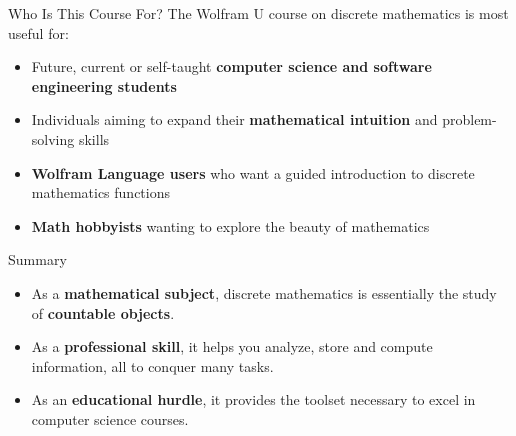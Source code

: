 \documentclass[aspectratio=169,11pt]{beamer}
\newcommand{\hly}[1]{\colorbox{hlYellow}{#1}}
\begin{document}
\begin{frame}{Who Is This Course For?}
  The Wolfram U course on discrete mathematics is most useful for:

  \bigskip
  \begin{itemize}
    \setlength\itemsep{0.5em}
    \item Future, current or self-taught
          \textbf{computer science and software engineering students}
    \item Individuals aiming to expand their
          \textbf{mathematical intuition} and problem-solving skills
    \item \textbf{Wolfram Language users} who want a guided
          introduction to discrete mathematics functions
    \item \textbf{Math hobbyists} wanting to explore the
          beauty of mathematics
  \end{itemize}
\end{frame}

\begin{frame}{Summary}
  \begin{itemize}
    \setlength\itemsep{0.8em}
    \item As a \textbf{mathematical subject}, discrete mathematics
          is essentially the study of \textbf{countable objects}.

    \item As a \textbf{professional skill}, it helps you analyze,
          store and compute information, all to conquer many tasks.

    \item As an \textbf{educational hurdle}, it provides the
          toolset necessary to
          \hly{excel in computer science courses}.
  \end{itemize}
\end{frame}
\end{document}
